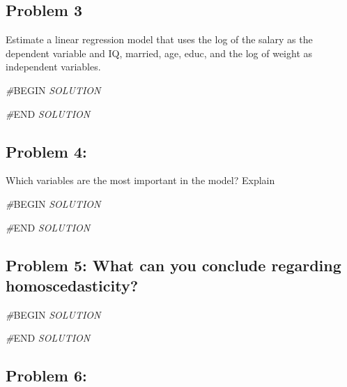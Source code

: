 \documentclass[
]{article}
\newenvironment{Shaded}{\begin{snugshade}}{\end{snugshade}}
\newcommand{\CommentTok}[1]{\textcolor[rgb]{0.56,0.35,0.01}{\textit{#1}}}
\newcommand{\RegionMarkerTok}[1]{#1}
\begin{document}
\subsection{Problem 3}\label{problem-3}

Estimate a linear regression model that uses the log of the salary as
the dependent variable and IQ, married, age, educ, and the log of weight
as independent variables.

\begin{Shaded}
\begin{Highlighting}[]
\CommentTok{\#}\RegionMarkerTok{BEGIN}\CommentTok{ SOLUTION}


\CommentTok{\#}\RegionMarkerTok{END}\CommentTok{ SOLUTION}
\end{Highlighting}
\end{Shaded}

\subsection{Problem 4:}\label{problem-4}

Which variables are the most important in the model? Explain

\begin{Shaded}
\begin{Highlighting}[]
\CommentTok{\#}\RegionMarkerTok{BEGIN}\CommentTok{ SOLUTION}


\CommentTok{\#}\RegionMarkerTok{END}\CommentTok{ SOLUTION}
\end{Highlighting}
\end{Shaded}

\subsection{Problem 5: What can you conclude regarding
homoscedasticity?}\label{problem-5-what-can-you-conclude-regarding-homoscedasticity}

\begin{Shaded}
\begin{Highlighting}[]
\CommentTok{\#}\RegionMarkerTok{BEGIN}\CommentTok{ SOLUTION}


\CommentTok{\#}\RegionMarkerTok{END}\CommentTok{ SOLUTION}
\end{Highlighting}
\end{Shaded}

\subsection{Problem 6:}\label{problem-6}
\end{document}
